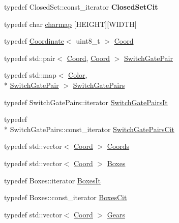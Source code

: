 \begin{DoxyCompactItemize}
\item 
\hypertarget{namespaceboxedin_a351056338794ee3a6c5e7efec3dc1908}{typedef Closed\+Set\+::const\+\_\+iterator {\bfseries Closed\+Set\+Cit}}\label{namespaceboxedin_a351056338794ee3a6c5e7efec3dc1908}

\item 
typedef char \hyperlink{namespaceboxedin_a95e88d677e0a17d3f9e4a9b0de980c4f}{charmap} \mbox{[}H\+E\+I\+G\+H\+T\mbox{]}\mbox{[}W\+I\+D\+T\+H\mbox{]}
\item 
typedef \hyperlink{structboxedin_1_1Coordinate}{Coordinate}$<$ uint8\+\_\+t $>$ \hyperlink{namespaceboxedin_afc0dedc740afcefb60a4dac20d984b16}{Coord}
\item 
typedef std\+::pair$<$ \hyperlink{namespaceboxedin_afc0dedc740afcefb60a4dac20d984b16}{Coord}, \hyperlink{namespaceboxedin_afc0dedc740afcefb60a4dac20d984b16}{Coord} $>$ \hyperlink{namespaceboxedin_ac85f00ec0a253d53da24ecfa3671f6f9}{Switch\+Gate\+Pair}
\item 
typedef std\+::map$<$ \hyperlink{namespaceboxedin_a5d4a85861c29b50e230046a0e9c2cd73}{Color}, \\*
\hyperlink{namespaceboxedin_ac85f00ec0a253d53da24ecfa3671f6f9}{Switch\+Gate\+Pair} $>$ \hyperlink{namespaceboxedin_a03c7cc22a04c973f84db352c32e17a2c}{Switch\+Gate\+Pairs}
\item 
typedef Switch\+Gate\+Pairs\+::iterator \hyperlink{namespaceboxedin_ab405434884f36ef897ef6c9227a72342}{Switch\+Gate\+Pairs\+It}
\item 
typedef \\*
Switch\+Gate\+Pairs\+::const\+\_\+iterator \hyperlink{namespaceboxedin_a6aae579b92c95f39c9aaaf6013fa0c29}{Switch\+Gate\+Pairs\+Cit}
\item 
typedef std\+::vector$<$ \hyperlink{namespaceboxedin_afc0dedc740afcefb60a4dac20d984b16}{Coord} $>$ \hyperlink{namespaceboxedin_adfad3f57ac730784b07eeef6e6244ceb}{Coords}
\item 
typedef std\+::vector$<$ \hyperlink{namespaceboxedin_afc0dedc740afcefb60a4dac20d984b16}{Coord} $>$ \hyperlink{namespaceboxedin_a9cf4c1fe66d111542a6b853f276b5d63}{Boxes}
\item 
typedef Boxes\+::iterator \hyperlink{namespaceboxedin_ad09b9ae0e0fe0b8fe4ded755de971056}{Boxes\+It}
\item 
typedef Boxes\+::const\+\_\+iterator \hyperlink{namespaceboxedin_ae12efbf42d3d7cae8554a7cfe89373ef}{Boxes\+Cit}
\item 
typedef std\+::vector$<$ \hyperlink{namespaceboxedin_afc0dedc740afcefb60a4dac20d984b16}{Coord} $>$ \hyperlink{namespaceboxedin_a9fa1a20bcfcbdd4d7cad2d6fc92725f6}{Gears}

\end{DoxyCompactItemize}
